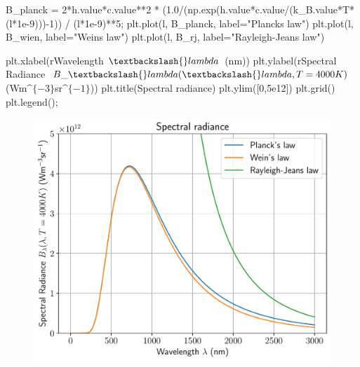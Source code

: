 \documentclass[
  letterpaper,
  DIV=11,
  numbers=noendperiod]{scrreprt}
\newenvironment{Shaded}{\begin{snugshade}}{\end{snugshade}}
\newcommand{\DecValTok}[1]{\textcolor[rgb]{0.68,0.00,0.00}{#1}}
\newcommand{\FloatTok}[1]{\textcolor[rgb]{0.68,0.00,0.00}{#1}}
\newcommand{\NormalTok}[1]{\textcolor[rgb]{0.00,0.23,0.31}{#1}}
\newcommand{\OperatorTok}[1]{\textcolor[rgb]{0.37,0.37,0.37}{#1}}
\newcommand{\StringTok}[1]{\textcolor[rgb]{0.13,0.47,0.30}{#1}}
\newcommand{\VerbatimStringTok}[1]{\textcolor[rgb]{0.13,0.47,0.30}{#1}}
\begin{document}
\begin{Shaded}
\begin{Highlighting}[]
\NormalTok{B\_planck }\OperatorTok{=} \DecValTok{2}\OperatorTok{*}\NormalTok{h.value}\OperatorTok{*}\NormalTok{c.value}\OperatorTok{**}\DecValTok{2} \OperatorTok{*}\NormalTok{ (}\FloatTok{1.0}\OperatorTok{/}\NormalTok{(np.exp(h.value}\OperatorTok{*}\NormalTok{c.value}\OperatorTok{/}\NormalTok{(k\_B.value}\OperatorTok{*}\NormalTok{T}\OperatorTok{*}\NormalTok{(l}\OperatorTok{*}\FloatTok{1e{-}9}\NormalTok{)))}\OperatorTok{{-}}\DecValTok{1}\NormalTok{)) }\OperatorTok{/}\NormalTok{ (l}\OperatorTok{*}\FloatTok{1e{-}9}\NormalTok{)}\OperatorTok{**}\DecValTok{5}\OperatorTok{;}
\NormalTok{plt.plot(l, B\_planck, label}\OperatorTok{=}\StringTok{"Planck\textquotesingle{}s law"}\NormalTok{)}
\NormalTok{plt.plot(l, B\_wien, label}\OperatorTok{=}\StringTok{"Wein\textquotesingle{}s law"}\NormalTok{)}
\NormalTok{plt.plot(l, B\_rj, label}\OperatorTok{=}\StringTok{"Rayleigh{-}Jeans law"}\NormalTok{)}

\NormalTok{plt.xlabel(}\VerbatimStringTok{r\textquotesingle{}Wavelength $\textbackslash{}lambda$ (nm)\textquotesingle{}}\NormalTok{)}
\NormalTok{plt.ylabel(}\VerbatimStringTok{r\textquotesingle{}Spectral Radiance $B\_\textbackslash{}lambda(\textbackslash{}lambda, T=4000K)$ (Wm$\^{}\{{-}3\}$sr$\^{}\{{-}1\}$)\textquotesingle{}}\NormalTok{)}
\NormalTok{plt.title(}\StringTok{\textquotesingle{}Spectral radiance\textquotesingle{}}\NormalTok{)}
\NormalTok{plt.ylim([}\DecValTok{0}\NormalTok{,}\FloatTok{5e12}\NormalTok{])}
\NormalTok{plt.grid()}
\NormalTok{plt.legend()}\OperatorTok{;}
\end{Highlighting}
\end{Shaded}

\begin{figure}[H]

{\centering \includegraphics{SP1.1_-_Stellar_Properties_files/figure-pdf/cell-21-output-1.pdf}

}

\end{figure}
\end{document}
